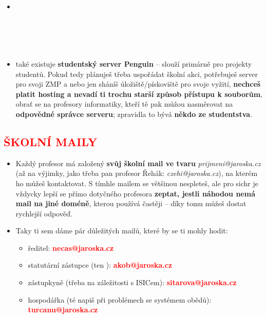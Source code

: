 \documentclass{article}
\newcommand{\podnadpis}[1]{
  \subsection*{\textcolor{red}{#1}}
}
\begin{document}
\begin{redbox}
  \begin{itemize}[leftmargin=10pt]
    \item[\textcolor{white}{\textbullet}] \textcolor{white}{trochu složitější je to pak s připojováním notebooků na školní wifi: jde to, ale dře to. Ideální je zajít za panem profesorem Blahou (jehož kabinet si můžeš najít na plánku školy) a poprosit ho o zpřístupnění. Trochu se ti pohrabe v notebooku a zařídí ti, že se bez problémů budeš moct připojit a psát si zápisky online třeba na OneNote. -- nelíbí se mi tento text}
  \end{itemize}
\end{redbox}
\begin{itemize}[leftmargin=10pt]
  \item  také existuje \textbf{studentský server Penguin} -- slouží primárně pro projekty studentů. Pokud tedy plánuješ třeba uspořádat školní akci, potřebuješ server pro svoji ZMP a nebo jen sháníš úložiště/pískoviště pro svoje vyžití, \textbf{nechceš platit hosting a nevadí ti trochu starší způsob přístupu k souborům}, obrať se na profesory informatiky, kteří tě pak můžou nasměrovat na \textbf{odpovědné správce serveru}; zpravidla to bývá \textbf{někdo ze studentstva}.
\end{itemize}

\podnadpis{ŠKOLNÍ MAILY}
\begin{itemize}[leftmargin=10pt]
  \item Každý profesor má založený \textbf{svůj školní mail ve tvaru} \textit{prijmeni@jaroska.cz} (až na výjimky, jako třeba pan profesor Řehák: \textit{czehi@jaroska.cz}), na kterém ho můžeš kontaktovat. S tímhle mailem se většinou nespleteš, ale pro sichr je vždycky lepší se přímo dotyčného profesora \textbf{zeptat, jestli náhodou nemá mail na jiné doméně}, kterou používá častěji -- díky tomu můžeš dostat rychlejší odpověď.
  \item  Taky ti sem dáme pár důležitých mailů, které by se ti mohly hodit:
  \begin{itemize}[leftmargin=0pt]
    \item  ředitel: \textcolor{red}{\textbf{necas@jaroska.cz}}
    \item statutární zástupce (ten ): \textcolor{red}{\textbf{akob@jaroska.cz}}
    \item zástupkyně (třeba na záležitosti s ISICem): \textcolor{red}{\textbf{sitarova@jaroska.cz}}
    \item  hospodářka (té napiš při problémech se systémem obědů): \textcolor{red}{\textbf{turcanu@jaroska.cz}}
  \end{itemize}
\end{itemize}
\end{document}

